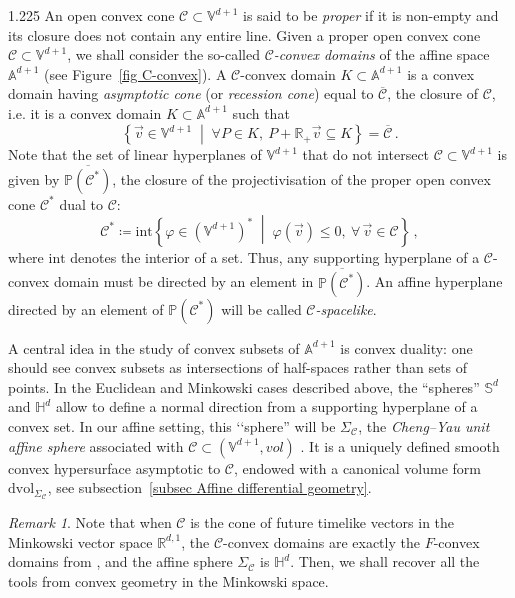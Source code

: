 \documentclass[reqno, a4paper]{amsart}
\numberwithin{equation}{section}
\numberwithin{figure}{section}
\theoremstyle{definition}
\theoremstyle{remark}
\newtheorem{remark}[theorem]{Remark}
\newcommand{\R}{\mathbb{R}} %
\newcommand{\V}{\mathbb{V}} %
\newcommand{\A}{\mathbb{A}} %
\renewcommand{\P}{\mathbb{P}} %
\newcommand{\Sph}{\mathbb{S}} %
\renewcommand{\H}{\mathbb{H}} %
\newcommand{\dif}{\mathrm{d}} %
\newcommand{\C}{\mathcal{C}} %
\renewcommand{\S}{\Sigma_\C} %
\newcommand{\linvol}{\mathit{vol}} %
\newcommand{\dvol}{\dif \mathrm{vol}} %
\newcommand{\st}{\; \middle\vert \;} %
\begin{document}
\begin{spacing}{1.225}
An open convex cone $\C \subset \V^{d+1}$ is said to be \emph{proper} if it is non-empty and its closure does not contain any entire line. 
Given a proper open convex cone $\C \subset \V^{d+1}$, we shall consider the so-called \emph{$\C$-convex domains} of the affine space $\A^{d+1}$ (see Figure~\ref{fig C-convex}). A $\C$-convex domain $K \subset \A^{d+1}$ is a convex domain having \emph{asymptotic cone} (or \emph{recession cone}) equal to $\overline{\C}$, the closure of $\C$, i.e. it is a convex domain $K \subset \A^{d+1}$ such that
\begin{equation*}
 \left\lbrace \vec{v} \in \V^{d+1} \st \forall P \in K, \ P+ \R_+ \vec{v} \subseteq K \right\rbrace = \overline{\C} \, .
\end{equation*}
Note that the set of linear hyperplanes of $\V^{d+1}$ that do not intersect $\C \subset \V^{d+1}$ is given by $\overline{\P(\C^*)}$, the closure of the projectivisation of the proper open convex cone $\C^*$ dual to $\C$:
\begin{equation*}
\C^* \coloneqq \mathrm{int} \left\lbrace \varphi \in (\V^{d+1})^* \st \varphi(\vec{v}) \leq 0, \ \forall \, \vec{v} \in \C\right\rbrace \, ,
\end{equation*}
where $\mathrm{int}$ denotes the interior of a set. Thus, any supporting hyperplane of a $\C$-convex domain must be directed by an element in $\overline{\P(\C^*)}$. An affine hyperplane directed by an element of $\P(\C^*)$ will be called \emph{$\C$-spacelike}.



A central idea in the study of convex subsets of $\A^{d+1}$ is convex duality: one should see convex subsets as intersections of half-spaces rather than sets of points. 
In the Euclidean and Minkowski cases described above, the ``spheres'' \(\Sph^{d}\) and \(\H^d\) allow to define a normal direction from a supporting hyperplane of a convex set. In our affine setting, 
this ‘‘sphere'' will be $\S$, the \emph{Cheng--Yau unit affine sphere} associated with $\C \subset (\V^{d+1}, \linvol)$ \cite{Cheng_Yau_77,Loftin_10}. It is a uniquely defined smooth convex hypersurface asymptotic to $\C$, endowed with a canonical volume form $\dvol_{\S}$, see subsection~\ref{subsec Affine differential geometry}. 

\begin{remark}
Note that when $\C$ is the cone of future timelike vectors in the Minkowski vector space $\R^{d,1}$,   the $\C$-convex domains are exactly the $F$-convex domains from \cite{Fillastre_Veronelli_16,Bonsante_Fillastre_17}, and the affine sphere $\S$ is $\H^d$. Then, we shall recover all the tools from convex geometry in the Minkowski space.
\end{remark}


\end{spacing}
\end{document}
